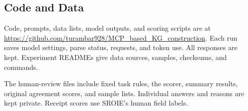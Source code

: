\subsection{Code and Data}
\label{sec:eval:artifacts}

Code, prompts, data lists, model outputs, and scoring scripts are at
\url{https://github.com/turambar928/MCP_based_KG_construction}.
Each run saves model settings, parse status, requests, and token use.
All responses are kept. Experiment READMEs give data sources, samples,
checksums, and commands.

The human-review files include fixed task rules, the scorer, summary results,
original agreement scores, and sample lists. Individual answers and reasons
are kept private. Receipt scores use SROIE's human field labels.
